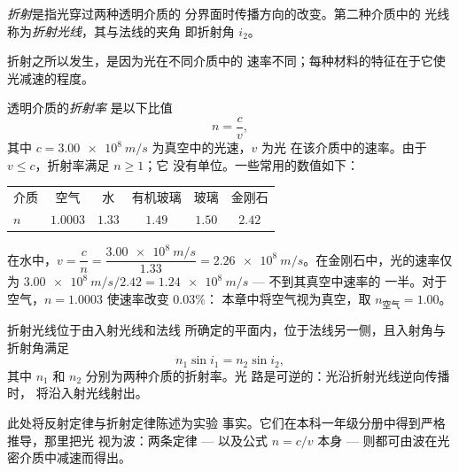 \begin{definition}[折射]\label{def:g10:refraction:refraction}
\emph{折射}是指光穿过两种透明介质的
分界面时传播方向的改变。第二种介质中的
光线称为\emph{折射光线}，其与法线的夹角
即折射角 $i_2$。
\end{definition}

折射之所以发生，是因为光在不同介质中的
速率不同；每种材料的特征在于它使光减速的程度。

\begin{definition}[折射率]\label{def:g10:refraction:index}
透明介质的\emph{折射率}
是以下比值
\[
n = \frac{c}{v},
\]
其中 $c = \qty{3.00e8}{m/s}$ 为真空中的光速，$v$ 为光
在该介质中的速率。由于 $v \leq c$，折射率满足 $n \geq 1$；它
没有单位。一些常用的数值如下：
\begin{center}
\begin{tabular}{lccccc}
介质 & 空气 & 水 & 有机玻璃 & 玻璃 & 金刚石 \\
$n$ & $1.0003$ & $1.33$ & $1.49$ & $1.50$ & $2.42$ \\
\end{tabular}
\end{center}
\end{definition}

\begin{example}[光在水中的速率]\label{ex:g10:refraction:speed}
在水中，$v = \dfrac{c}{n} = \dfrac{\qty{3.00e8}{m/s}}{1.33}
= \qty{2.26e8}{m/s}$。在金刚石中，光的速率仅为
$\qty{3.00e8}{m/s}/2.42 = \qty{1.24e8}{m/s}$ --- 不到其真空中速率的
一半。对于空气，$n = 1.0003$ 使速率改变 $0.03\%$：
本章中将空气视为真空，取 $n_{\text{空气}} = 1.00$。
\end{example}

\begin{theorem}[斯涅耳折射定律]\label{thm:g10:refraction:snell}
折射光线位于由入射光线和法线
所确定的平面内，位于法线另一侧，且入射角与
折射角满足
\[
n_1 \sin i_1 = n_2 \sin i_2 ,
\]
其中 $n_1$ 和 $n_2$ 分别为两种介质的折射率。光
路是可逆的：光沿折射光线逆向传播时，
将沿入射光线射出。
\end{theorem}
\admitted

\begin{remark}\label{rem:g10:refraction:honest}
此处将反射定律与折射定律陈述为实验
事实。它们在本科一年级分册中得到严格推导，那里把光
视为波：两条定律 --- 以及公式 $n = c/v$ 本身 ---
则都可由波在光密介质中减速而得出。
\end{remark}

